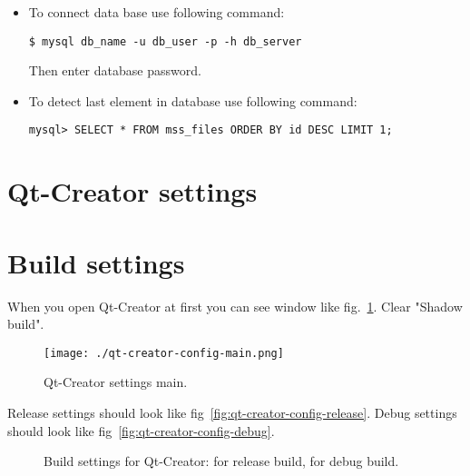 \begin{itemize}

\item To connect data base use following command:

\begin{lstlisting}
$ mysql db_name -u db_user -p -h db_server
\end{lstlisting}

Then enter database password.

\item To detect last element in database use following command:

\begin{lstlisting}
mysql> SELECT * FROM mss_files ORDER BY id DESC LIMIT 1;
\end{lstlisting}

\end{itemize}

\section{Qt-Creator settings}

\section{Build settings}\label{sec:qt-build}

When you open Qt-Creator at first you can see window like fig.~\ref{fig:qt-creator-config-main}. Clear "Shadow build".

\begin{figure}[htp]
  \centering
  \texttt{[image: ./qt-creator-config-main.png]}
  \caption{Qt-Creator settings main.}
  \label{fig:qt-creator-config-main}
\end{figure}

Release settings should look like fig~\ref{fig:qt-creator-config-release}. Debug settings should look like fig~\ref{fig:qt-creator-config-debug}.

\begin{figure}[htp]
  \centering
  \caption{Build settings for Qt-Creator:  for release build,  for debug build.}
\end{figure}


